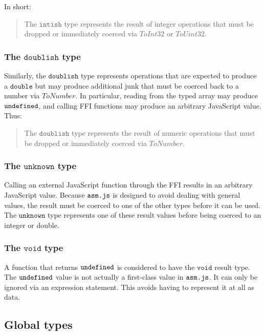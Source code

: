 \documentclass{article}
\newcommand{\mathjs}[1]{\mbox{\texttt{{#1}}}}
\newcommand{\double}{\mathtt{double}}
\newcommand{\unk}{\mathtt{unknown}}
\newcommand{\void}{\mathtt{void}}
\newcommand{\intish}{\mathtt{intish}}
\newcommand{\doublish}{\mathtt{doublish}}
\begin{document}
In short:

\begin{quote}
The $\intish$ type represents the result of integer operations that
must be dropped or immediately coerced via $\mathit{ToInt32}$ or
$\mathit{ToUint32}$.
\end{quote}

\subsubsection*{The $\doublish$ type}

Similarly, the $\doublish$ type represents operations that are
expected to produce a $\double$ but may produce additional junk that
must be coerced back to a number via $\mathit{ToNumber}$. In
particular, reading from the typed array may produce
$\mathjs{undefined}$, and calling FFI functions may produce an
arbitrary JavaScript value. Thus:

\begin{quote}
The $\doublish$ type represents the result of numeric operations that
must be dropped or immediately coerced via $\mathit{ToNumber}$.
\end{quote}

\subsubsection*{The $\unk$ type}

Calling an external JavaScript function through the FFI results in an
arbitrary JavaScript value. Because $\mathjs{asm.js}$ is designed to
avoid dealing with general values, the result must be coerced to one
of the other types before it can be used. The $\unk$ type represents
one of these result values before being coerced to an integer or
double.

\subsubsection*{The $\void$ type}

A function that returns $\mathjs{undefined}$ is considered to have the
$\void$ result type. The $\mathjs{undefined}$ value is not actually a
first-class value in $\mathjs{asm.js}$. It can only be ignored via an
expression statement. This avoids having to represent it at all as
data.

\subsection{Global types}
\end{document}

